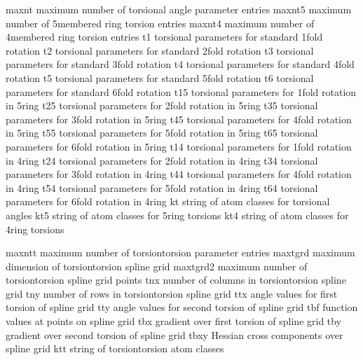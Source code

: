 \documentclass[letterpaper,11pt,english]{sphinxmanual}
\begin{document}

\begin{sphinxVerbatim}[commandchars=\\\{\}]
maxnt           maximum number of torsional angle parameter entries
maxnt5          maximum number of 5\PYGZhy{}membered ring torsion entries
maxnt4          maximum number of 4\PYGZhy{}membered ring torsion entries
t1              torsional parameters for standard 1\PYGZhy{}fold rotation
t2              torsional parameters for standard 2\PYGZhy{}fold rotation
t3              torsional parameters for standard 3\PYGZhy{}fold rotation
t4              torsional parameters for standard 4\PYGZhy{}fold rotation
t5              torsional parameters for standard 5\PYGZhy{}fold rotation
t6              torsional parameters for standard 6\PYGZhy{}fold rotation
t15             torsional parameters for 1\PYGZhy{}fold rotation in 5\PYGZhy{}ring
t25             torsional parameters for 2\PYGZhy{}fold rotation in 5\PYGZhy{}ring
t35             torsional parameters for 3\PYGZhy{}fold rotation in 5\PYGZhy{}ring
t45             torsional parameters for 4\PYGZhy{}fold rotation in 5\PYGZhy{}ring
t55             torsional parameters for 5\PYGZhy{}fold rotation in 5\PYGZhy{}ring
t65             torsional parameters for 6\PYGZhy{}fold rotation in 5\PYGZhy{}ring
t14             torsional parameters for 1\PYGZhy{}fold rotation in 4\PYGZhy{}ring
t24             torsional parameters for 2\PYGZhy{}fold rotation in 4\PYGZhy{}ring
t34             torsional parameters for 3\PYGZhy{}fold rotation in 4\PYGZhy{}ring
t44             torsional parameters for 4\PYGZhy{}fold rotation in 4\PYGZhy{}ring
t54             torsional parameters for 5\PYGZhy{}fold rotation in 4\PYGZhy{}ring
t64             torsional parameters for 6\PYGZhy{}fold rotation in 4\PYGZhy{}ring
kt              string of atom classes for torsional angles
kt5             string of atom classes for 5\PYGZhy{}ring torsions
kt4             string of atom classes for 4\PYGZhy{}ring torsions
\end{sphinxVerbatim}


\begin{sphinxVerbatim}[commandchars=\\\{\}]
maxntt          maximum number of torsion\PYGZhy{}torsion parameter entries
maxtgrd         maximum dimension of torsion\PYGZhy{}torsion spline grid
maxtgrd2        maximum number of torsion\PYGZhy{}torsion spline grid points
tnx             number of columns in torsion\PYGZhy{}torsion spline grid
tny             number of rows in torsion\PYGZhy{}torsion spline grid
ttx             angle values for first torsion of spline grid
tty             angle values for second torsion of spline grid
tbf             function values at points on spline grid
tbx             gradient over first torsion of spline grid
tby             gradient over second torsion of spline grid
tbxy            Hessian cross components over spline grid
ktt             string of torsion\PYGZhy{}torsion atom classes
\end{sphinxVerbatim}
\end{document}
